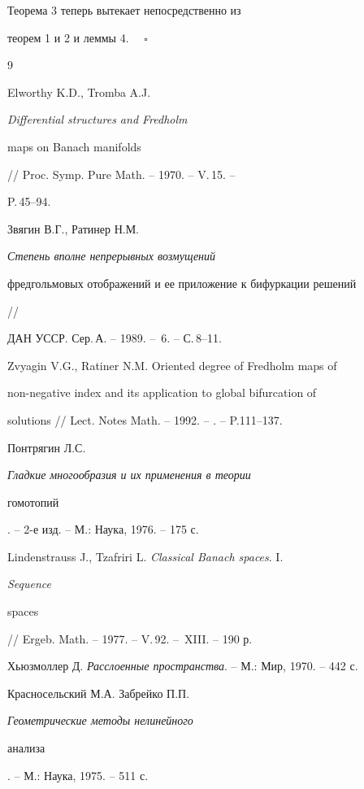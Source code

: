  


Теорема 3 теперь вытекает непосредственно из 


теорем 1 и 2 и леммы 4. $\quad\square$ 


 


 


\begin{thebibliography}{9} 


 




Elworthy K.D., Tromba A.J. {\em Differential structures and Fredholm 


maps on Banach manifolds} // Proc. Symp. Pure Math. -- 1970. -- V.\,15. -- 


P.\,45--94. 


 




Звягин В.Г., Ратинер Н.М. {\em Степень вполне непрерывных возмущений 


фредгольмовых отображений и ее приложение к бифуркации решений} // 


ДАН УССР. Сер.\,А. -- 1989. -- \No\,6. -- С.\,8--11. 


 




Zvyagin V.G., Ratiner N.M. Oriented degree of Fredholm maps of 


non-negative index and its application to global bifurcation of 


solutions // Lect. Notes Math. -- 1992. -- . -- P.111--137. 


 




Понтрягин Л.С. {\em Гладкие многообразия и их применения в теории 


гомотопий}. -- 2-е изд. -- М.: Наука, 1976. -- 175 с. 


 




Lindenstrauss J., Tzafriri L. {\em Classical Banach spaces}. I. 


{\em Sequence 


spaces} // Ergeb. Math. -- 1977. -- V.\,92. -- \No\,XIII. -- 190 р. 


 




Хьюзмоллер Д. {\em Расслоенные пространства}. -- М.: Мир, 1970. -- 442 с. 


 




Красносельский М.А. Забрейко П.П. {\em Геометрические методы нелинейного 


анализа}. -- М.: Наука, 1975. -- 511 с. 


 


\end{thebibliography} 


